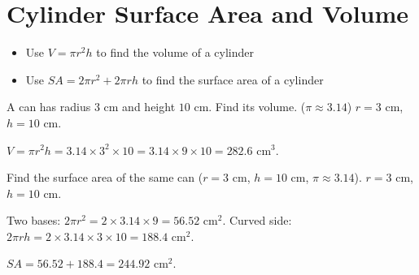 \section{Cylinder Surface Area and Volume}

\begin{stepGoal}
\begin{itemize}
    \item Use $V = \pi r^{2} h$ to find the volume of a cylinder
    \item Use $SA = 2\pi r^{2} + 2\pi r h$ to find the surface area of a cylinder
\end{itemize}
\end{stepGoal}

\begin{stepVocabBox}
\end{stepVocabBox}

\begin{stepsCard}
\end{stepsCard}

\begin{stepExample}{A can has radius $3$ cm and height $10$ cm. Find its volume. ($\pi \approx 3.14$)}
     $r = 3$ cm, $h = 10$ cm.

     $V = \pi r^{2} h = 3.14 \times 3^{2} \times 10 = 3.14 \times 9 \times 10 = 282.6$ cm$^{3}$.

\end{stepExample}

\begin{stepExample}{Find the surface area of the same can ($r = 3$ cm, $h = 10$ cm, $\pi \approx 3.14$).}
     $r = 3$ cm, $h = 10$ cm.

     Two bases: $2\pi r^{2} = 2 \times 3.14 \times 9 = 56.52$ cm$^{2}$. \quad
    Curved side: $2\pi r h = 2 \times 3.14 \times 3 \times 10 = 188.4$ cm$^{2}$.

    $SA = 56.52 + 188.4 = 244.92$ cm$^{2}$.
\end{stepExample}

